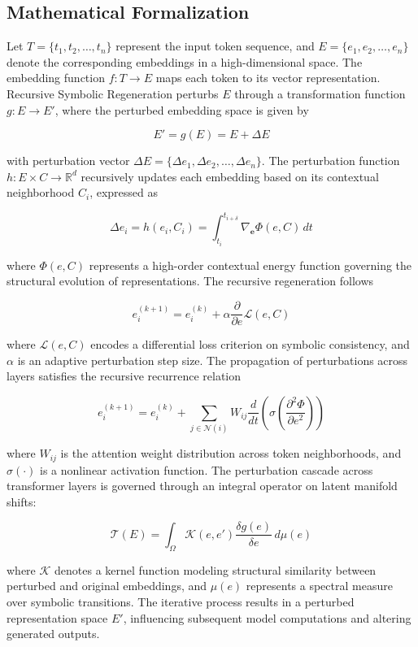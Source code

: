 \documentclass[5p,times]{elsarticle}
\begin{document}
\subsection{Mathematical Formalization}

Let \( T = \{t_1, t_2, \ldots, t_n\} \) represent the input token sequence, and \( E = \{e_1, e_2, \ldots, e_n\} \) denote the corresponding embeddings in a high-dimensional space. The embedding function \( f: T \to E \) maps each token to its vector representation. Recursive Symbolic Regeneration perturbs \( E \) through a transformation function \( g: E \to E' \), where the perturbed embedding space is given by

\[
E' = g(E) = E + \Delta E
\]

with perturbation vector \( \Delta E = \{\Delta e_1, \Delta e_2, \ldots, \Delta e_n\} \). The perturbation function \( h: E \times C \to \mathbb{R}^d \) recursively updates each embedding based on its contextual neighborhood \( C_i \), expressed as

\[
\Delta e_i = h(e_i, C_i) = \int_{t_i}^{t_{i+\delta}} \nabla_{\mathbf{e}} \Phi(e, C) \, dt
\]

where \( \Phi(e, C) \) represents a high-order contextual energy function governing the structural evolution of representations. The recursive regeneration follows

\[
e_i^{(k+1)} = e_i^{(k)} + \alpha \frac{\partial}{\partial e} \mathcal{L}(e, C)
\]

where \( \mathcal{L}(e, C) \) encodes a differential loss criterion on symbolic consistency, and \( \alpha \) is an adaptive perturbation step size. The propagation of perturbations across layers satisfies the recursive recurrence relation

\[
e_i^{(k+1)} = e_i^{(k)} + \sum_{j \in \mathcal{N}(i)} W_{ij} \frac{d}{dt} \left( \sigma\left( \frac{\partial^2 \Phi}{\partial e^2} \right) \right)
\]

where \( W_{ij} \) is the attention weight distribution across token neighborhoods, and \( \sigma(\cdot) \) is a nonlinear activation function. The perturbation cascade across transformer layers is governed through an integral operator on latent manifold shifts:

\[
\mathcal{T}(E) = \int_{\Omega} \mathcal{K}(e, e') \frac{\delta g(e)}{\delta e} \, d\mu(e)
\]

where \( \mathcal{K} \) denotes a kernel function modeling structural similarity between perturbed and original embeddings, and \( \mu(e) \) represents a spectral measure over symbolic transitions. The iterative process results in a perturbed representation space \( E' \), influencing subsequent model computations and altering generated outputs.
\end{document}
